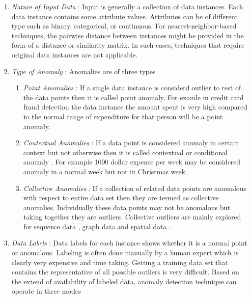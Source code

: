 \begin{enumerate}
	\item \textit{Nature of Input Data} : Input
	is generally a collection of data instances. Each data instance contains some attribute values. Attributes can be of different type such as binary, categorical, or continuous. For nearest-neighbor-based techniques, the pairwise distance between instances might be
	provided in the form of a distance or similarity matrix. In such cases, techniques that
	require original data instances are not applicable.
	
	\item \textit{Type of Anomaly} :  
	Anomalies are of three types
	\begin{enumerate}
		\item \textit{Point Anomalies} : If a single data instance is considerd outlier to rest of the data points then it is called point anomaly. For examle in credit card  fraud detection the data instance the amount spent is very high compared to the normal range of expenditure
		for that person will be a point anomaly.
		
		\item \textit{Contextual Anomalies} : If a data point is considered anomaly in certain context but not otherwise then it  is called contextual or conditional anomaly \cite{contextual}. For example 1000 dollar expense per week may be considered anomaly in a normal week but not in Christmas week.
		
		\item \textit{Collective Anomalies} : If a collection of related data points are anomalous with respect to entire data set then they are termed as collective anomalies. Individually these data points may not be anomalous but taking together they are outliers. Collective outliers are mainly explored for sequence data \cite{ca1},
		graph data \cite{ca2} and spatial data \cite{ca3}.
	\end{enumerate}
	
	
	
	\item \textit{Data Labels} : 
	Data labels for each instance shows whether it is a normal point or anomalous. Labeling is often done manually by a human expert which is clearly very expensive and time taking. Getting a training data set that contains the representative of all possible outliers is very difficult. Based on the extend of availability of labeled data, anomaly detection technique can operate in three modes
	

\end{enumerate}
